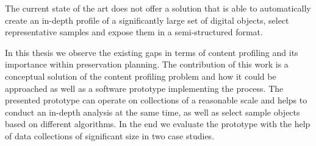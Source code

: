 The current state of the art does not offer a solution that is able to automatically create an in-depth profile of a significantly large set of digital objects, select representative samples and expose them in a semi-structured format.

In this thesis we observe the existing gaps in terms of content profiling and its importance within preservation
planning.
The contribution of this work is a conceptual solution of the content profiling problem and how it could be approached as well as a software prototype implementing the process.
The presented prototype can operate on collections of a reasonable scale and helps to conduct an in-depth analysis at the same time, as well as select sample objects based on different algorithms.
In the end we evaluate the prototype with the help of data collections of significant size in two case studies.